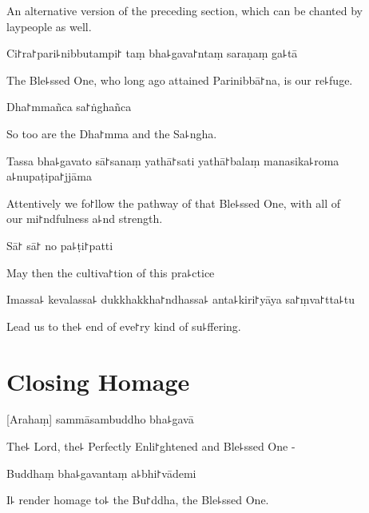 \begin{instruction}
  An alternative version of the preceding section, which can be chanted by laypeople as well.
\end{instruction}

Ci꜓ra꜓pari꜕nibbutampi꜓ taṃ bha꜕gava꜓ntaṃ saraṇaṃ ga꜕tā

\begin{english}
  The Ble꜕ssed One, who long ago attained Parinibbā꜓na, is our re꜕fuge.
\end{english}

Dha꜓mmañca sa꜓ṅghañca

\begin{english}
  So too are the Dha꜓mma and the Sa꜕ngha.
\end{english}

Tassa bha꜕gavato sā꜓sanaṃ yathā꜓sati yathā꜓balaṃ manasika꜕roma a꜕nupaṭipa꜓jjāma

\begin{english}
  Attentively we fo꜓llow the pathway of that Ble꜕ssed One, with all of \\our mi꜓ndfulness a꜕nd strength.
\end{english}

Sā꜓ sā꜓ no pa꜕ṭi꜓patti

\begin{english}
  May then the cultiva꜓tion of this pra꜕ctice
\end{english}

Imassa꜕ kevalassa꜕ dukkhakkha꜓ndhassa꜕ anta꜕kiri꜓yāya sa꜓ṃva꜓tta꜕tu

\begin{english}
  Lead us to the꜕ end of eve꜓ry kind of su꜕ffering.
\end{english}

\clearpage

\chapter{Closing Homage}                            %

[Arahaṃ] sammāsambuddho bha꜕gavā

\begin{english}
  The꜕ Lord, the꜕ Perfectly Enli꜓ghtened and Ble꜕ssed One -
\end{english}

Buddhaṃ bha꜕gavantaṃ a꜕bhi꜓vādemi

\begin{english}
  I꜕ render homage to꜕ the Bu꜓ddha, the Ble꜕ssed One.
\end{english}

